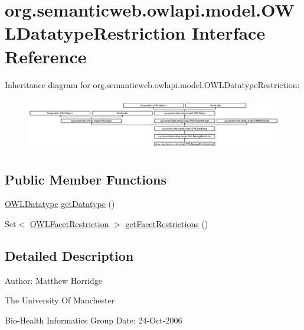 \hypertarget{interfaceorg_1_1semanticweb_1_1owlapi_1_1model_1_1_o_w_l_datatype_restriction}{\section{org.\-semanticweb.\-owlapi.\-model.\-O\-W\-L\-Datatype\-Restriction Interface Reference}
\label{interfaceorg_1_1semanticweb_1_1owlapi_1_1model_1_1_o_w_l_datatype_restriction}
}
Inheritance diagram for org.\-semanticweb.\-owlapi.\-model.\-O\-W\-L\-Datatype\-Restriction\-:\begin{figure}[H]
\begin{center}
\leavevmode
\includegraphics[height=2.314050cm]{interfaceorg_1_1semanticweb_1_1owlapi_1_1model_1_1_o_w_l_datatype_restriction}
\end{center}
\end{figure}
\subsection*{Public Member Functions}
\begin{DoxyCompactItemize}
\item 
\hyperlink{interfaceorg_1_1semanticweb_1_1owlapi_1_1model_1_1_o_w_l_datatype}{O\-W\-L\-Datatype} \hyperlink{interfaceorg_1_1semanticweb_1_1owlapi_1_1model_1_1_o_w_l_datatype_restriction_a41af7508d855c0e3da66a81a4349cf22}{get\-Datatype} ()
\item 
Set$<$ \hyperlink{interfaceorg_1_1semanticweb_1_1owlapi_1_1model_1_1_o_w_l_facet_restriction}{O\-W\-L\-Facet\-Restriction} $>$ \hyperlink{interfaceorg_1_1semanticweb_1_1owlapi_1_1model_1_1_o_w_l_datatype_restriction_a13e76f3c76ea9c358c7689bda2a22f71}{get\-Facet\-Restrictions} ()
\end{DoxyCompactItemize}


\subsection{Detailed Description}
Author\-: Matthew Horridge\par
 The University Of Manchester\par
 Bio-\/\-Health Informatics Group Date\-: 24-\/\-Oct-\/2006 

